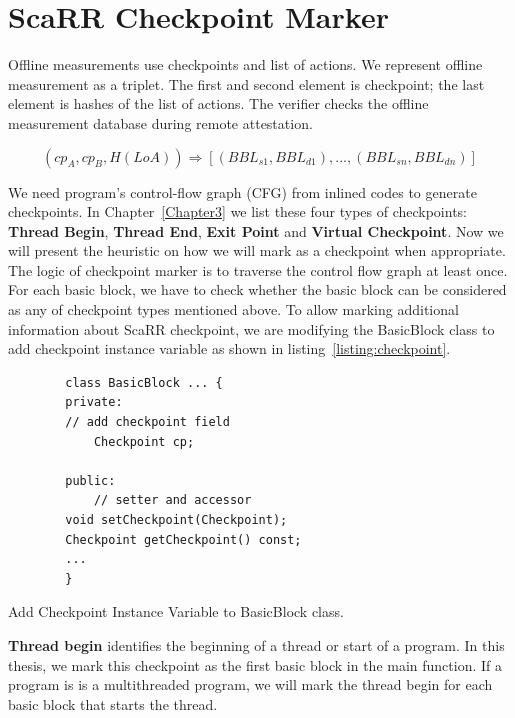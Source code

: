 \section{ScaRR Checkpoint Marker} 
\label{sec:scarr-checkpoint-marker}


Offline measurements use checkpoints and list of actions. We represent offline
measurement as a triplet. The first and second element is checkpoint; the last
element is hashes of the list of actions. The verifier checks the offline
measurement database during remote attestation.

$$(cp_A, cp_B, H(LoA)) \Rightarrow [(BBL_{s1}, BBL_{d1}), ..., (BBL_{sn},
BBL_{dn})]$$

We need program's control-flow graph (CFG) from inlined codes to generate
checkpoints. In Chapter~\ref{Chapter3} we list these four types of checkpoints:
\textbf{Thread Begin}, \textbf{Thread End}, \textbf{Exit Point} and
\textbf{Virtual Checkpoint}. Now we will present the heuristic on how we will
mark as a checkpoint when appropriate.  The logic of checkpoint marker is to
traverse the control flow graph at least once. For each basic block, we have to
check whether the basic block can be considered as any of checkpoint types
mentioned above. To allow marking additional information about ScaRR checkpoint,
we are modifying the BasicBlock class to add checkpoint instance variable as
shown in listing~\ref{listing:checkpoint}.

\begin{listing}[htbp]
    \begin{verbatim}
        class BasicBlock ... {
        private:
        // add checkpoint field
            Checkpoint cp;

        public:
            // setter and accessor
        void setCheckpoint(Checkpoint);
        Checkpoint getCheckpoint() const;
        ...
        }
    \end{verbatim}
    \caption{Add Checkpoint Instance Variable to BasicBlock class.}    
    \label{listing:checkpoint}
\end{listing}

\vspace{0.5cm}
\noindent \textbf{Thread begin} identifies the beginning of a thread or start of
a program. In this thesis, we mark this checkpoint as the first basic block in
the main function. If a program is is a multithreaded program, we will mark the
thread begin for each basic block that starts the thread.

